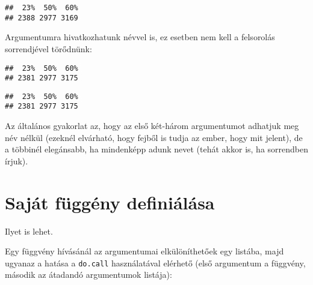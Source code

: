 \documentclass[]{book}
\newenvironment{Shaded}{\begin{snugshade}}{\end{snugshade}}
\newcommand{\KeywordTok}[1]{\textcolor[rgb]{0.13,0.29,0.53}{\textbf{#1}}}
\newcommand{\DataTypeTok}[1]{\textcolor[rgb]{0.13,0.29,0.53}{#1}}
\newcommand{\DecValTok}[1]{\textcolor[rgb]{0.00,0.00,0.81}{#1}}
\newcommand{\FloatTok}[1]{\textcolor[rgb]{0.00,0.00,0.81}{#1}}
\newcommand{\OperatorTok}[1]{\textcolor[rgb]{0.81,0.36,0.00}{\textbf{#1}}}
\newcommand{\NormalTok}[1]{#1}
\begin{document}
\begin{verbatim}
##  23%  50%  60% 
## 2388 2977 3169
\end{verbatim}

Argumentumra hivatkozhatunk névvel is, ez esetben nem kell a felsorolás
sorrendjével törődnünk:

\begin{Shaded}
\end{Shaded}

\begin{verbatim}
##  23%  50%  60% 
## 2381 2977 3175
\end{verbatim}

\begin{Shaded}
\end{Shaded}

\begin{verbatim}
##  23%  50%  60% 
## 2381 2977 3175
\end{verbatim}

Az általános gyakorlat az, hogy az első két-három argumentumot adhatjuk
meg név nélkül (ezeknél elvárható, hogy fejből is tudja az ember, hogy
mit jelent), de a többinél elegánsabb, ha mindenképp adunk nevet (tehát
akkor is, ha sorrendben írjuk).

\section{Saját függény definiálása}\label{sajat-fuggeny-definialasa}

Ilyet is lehet.

Egy függvény hívásánál az argumentumai elkülöníthetőek egy listába, majd
ugyanaz a hatása a \texttt{do.call} használatával elérhető (első
argumentum a függvény, második az átadandó argumentumok listája):
\end{document}
